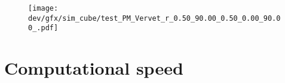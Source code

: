% 
% 
\begin{figure}[!tp]
\centering
\texttt{[image: dev/gfx/sim\_cube/test\_PM\_Vervet\_r\_0.50\_90.00\_0.50\_0.00\_90.00\_.pdf]}
\caption[simulation analysis]{\dummy{}}
\label{fig:PM_Vervet_r_0.50_90.00_0.50_0.00_90.00}
\end{figure}
% 
% 
% 
% 
% 
% 
\section{Computational speed}
% 
% 
% 